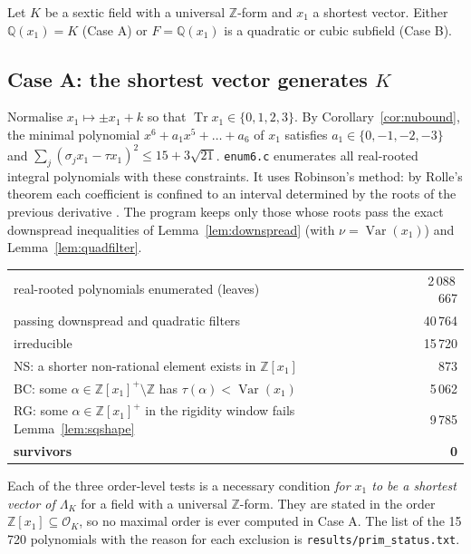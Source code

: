 \documentclass[11pt]{amsart}
\theoremstyle{definition}
\DeclareMathOperator{\Tr}{Tr}
\DeclareMathOperator{\Var}{Var}
\newcommand{\OK}{\mathcal{O}_K}
\newcommand{\Q}{\mathbb{Q}}
\newcommand{\Z}{\mathbb{Z}}
\newcommand{\LamK}{\Lambda_K}
\newcommand{\file}[1]{\texttt{#1}}
\begin{document}
Let $K$ be a sextic field with a universal $\Z$-form and $x_1$ a shortest vector.  Either
$\Q(x_1)=K$ (Case A) or $F=\Q(x_1)$ is a quadratic or cubic subfield (Case B).

\subsection{Case A: the shortest vector generates \texorpdfstring{$K$}{K}}\label{sec:caseA}
Normalise $x_1\mapsto\pm x_1+k$ so that $\Tr x_1\in\{0,1,2,3\}$.  By
Corollary~\ref{cor:nubound}, the minimal polynomial $x^6+a_1x^5+\dots+a_6$ of $x_1$ satisfies
$a_1\in\{0,-1,-2,-3\}$ and $\sum_j(\sigma_jx_1-\tau x_1)^2\le 15+3\sqrt{21}$.
\file{enum6.c} enumerates all real-rooted integral polynomials with these constraints.  It
uses Robinson's method: by Rolle's theorem each coefficient is confined to an interval
determined by the roots of the previous derivative \cite{Ro,MS}.  The program keeps only
those whose roots pass the exact downspread inequalities of Lemma~\ref{lem:downspread} (with
$\nu=\Var(x_1)$) and Lemma~\ref{lem:quadfilter}.

\begin{center}
\begin{tabular}{lr}
\toprule
real-rooted polynomials enumerated (leaves)& 2\,088\,667\\
passing downspread and quadratic filters & 40\,764\\
irreducible & 15\,720\\
\midrule
NS: a shorter non-rational element exists in $\Z[x_1]$ & 873\\
BC: some $\alpha\in\Z[x_1]^+\setminus\Z$ has $\tau(\alpha)<\Var(x_1)$ & 5\,062\\
RG: some $\alpha\in\Z[x_1]^+$ in the rigidity window fails Lemma~\ref{lem:sqshape} & 9\,785\\
\textbf{survivors} & \textbf{0}\\
\bottomrule
\end{tabular}
\end{center}

Each of the three order-level tests is a necessary condition \emph{for $x_1$ to be a shortest
vector of $\LamK$} for a field with a universal $\Z$-form.  They are stated in the order
$\Z[x_1]\subseteq\OK$, so no maximal order is ever computed in Case A.  The list of the
15\,720 polynomials with the reason for each exclusion is \file{results/prim\_status.txt}.
\end{document}
